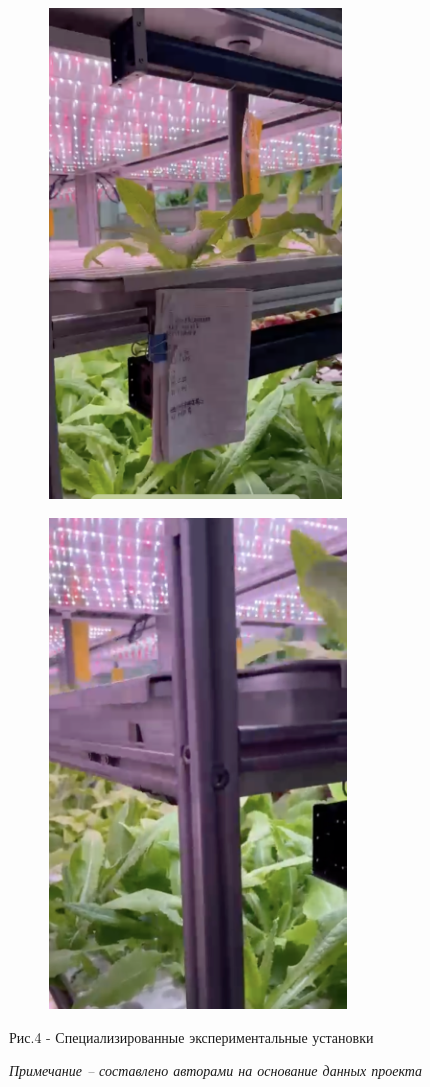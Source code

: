 \begin{figure}[H]
    \centering
    \begin{subfigure}[t]{0.45\textwidth}
        \centering
        \includegraphics[height=13cm]{media/ekon2/image49}
        \caption*{}
    \end{subfigure}
    \begin{subfigure}[t]{0.45\textwidth}
        \centering
        \includegraphics[height=13cm]{media/ekon2/image50}
        \caption*{}
    \end{subfigure}
    \caption*{Рис.4 - Специализированные экспериментальные установки}
    \caption*{\normalfont\emph{Примечание -- составлено авторами на основание данных проекта}}
\end{figure}

